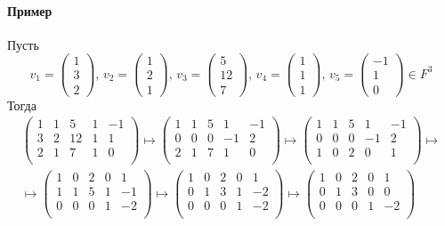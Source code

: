 \documentclass{article}
\begin{document}
\paragraph{Пример}

Пусть 
\[
v_1 =
\begin{pmatrix}
{1}\\{3}\\{2}
\end{pmatrix},\,
v_2 =
\begin{pmatrix}
{1}\\{2}\\{1}
\end{pmatrix},\,
v_3 =
\begin{pmatrix}
{5}\\{12}\\{7}
\end{pmatrix},\,
v_4 =
\begin{pmatrix}
{1}\\{1}\\{1}
\end{pmatrix},\,
v_5 =
\begin{pmatrix}
{-1}\\{1}\\{0}
\end{pmatrix}\in F^3
\]
Тогда
\begin{gather*}
\begin{pmatrix}
{1}&{1}&{5}&{1}&{-1}\\
{3}&{2}&{12}&{1}&{1}\\
{2}&{1}&{7}&{1}&{0}\\
\end{pmatrix}\mapsto
\begin{pmatrix}
{1}&{1}&{5}&{1}&{-1}\\
{0}&{0}&{0}&{-1}&{2}\\
{2}&{1}&{7}&{1}&{0}\\
\end{pmatrix}\mapsto
\begin{pmatrix}
{1}&{1}&{5}&{1}&{-1}\\
{0}&{0}&{0}&{-1}&{2}\\
{1}&{0}&{2}&{0}&{1}\\
\end{pmatrix}\mapsto\\\mapsto
\begin{pmatrix}
{1}&{0}&{2}&{0}&{1}\\
{1}&{1}&{5}&{1}&{-1}\\
{0}&{0}&{0}&{1}&{-2}\\
\end{pmatrix}\mapsto
\begin{pmatrix}
{1}&{0}&{2}&{0}&{1}\\
{0}&{1}&{3}&{1}&{-2}\\
{0}&{0}&{0}&{1}&{-2}\\
\end{pmatrix}\mapsto
\begin{pmatrix}
{1}&{0}&{2}&{0}&{1}\\
{0}&{1}&{3}&{0}&{0}\\
{0}&{0}&{0}&{1}&{-2}\\
\end{pmatrix}
\end{gather*}
\end{document}
